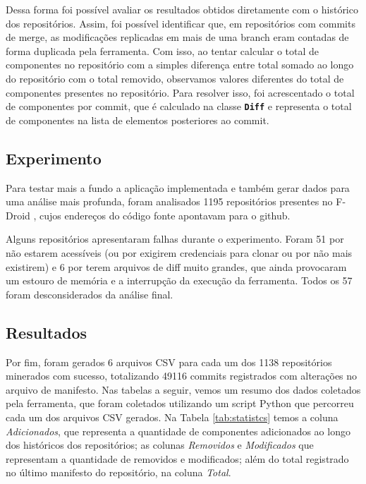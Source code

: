 \documentclass[a4paper,12pt]{article}
\begin{document}
{%

Dessa forma foi possível avaliar os resultados obtidos diretamente com o histórico dos repositórios. Assim, foi possível identificar que, em repositórios com commits de merge, as modificações replicadas em mais de uma branch eram contadas de forma duplicada pela ferramenta. Com isso, ao tentar calcular o total de componentes no repositório com a simples diferença entre total somado ao longo do repositório com o total removido, observamos valores diferentes do total de componentes presentes no repositório.  Para resolver isso, foi acrescentado o total de componentes por commit, que é calculado na classe {\small\texttt{\textbf{Diff}}} e representa o total de componentes na lista de elementos posteriores ao commit.


\subsection{Experimento}%
\label{sec:experimentos}

Para testar mais a fundo a aplicação implementada e também gerar dados para uma análise  mais profunda, foram analisados 1195 repositórios presentes no F-Droid \cite{fdroid}, cujos endereços do código fonte apontavam para o github.

Alguns repositórios apresentaram falhas durante o experimento. Foram 51 por não estarem acessíveis (ou por exigirem credenciais para clonar ou por não mais existirem) e 6 por terem arquivos de diff muito grandes, que ainda provocaram um estouro de memória e a interrupção da execução da ferramenta. Todos os 57 foram desconsiderados da análise final. 


\subsection{Resultados}%
\label{sec:resultados}

Por fim, foram gerados 6 arquivos CSV para cada um dos 1138 repositórios minerados com sucesso, totalizando 49116 commits registrados com alterações no arquivo de manifesto. Nas tabelas a seguir, vemos um resumo dos dados coletados pela ferramenta,  que foram coletados utilizando um script Python que percorreu cada um dos arquivos CSV gerados. Na Tabela \ref{tab:statistcs} temos a coluna \textit{Adicionados}, que representa a quantidade de componentes adicionados ao longo dos históricos dos repositórios; as colunas \textit{Removidos} e \textit{Modificados} que representam a quantidade de removidos e modificados; além do total registrado no último manifesto do repositório, na coluna \textit{Total}.

}
\end{document}
